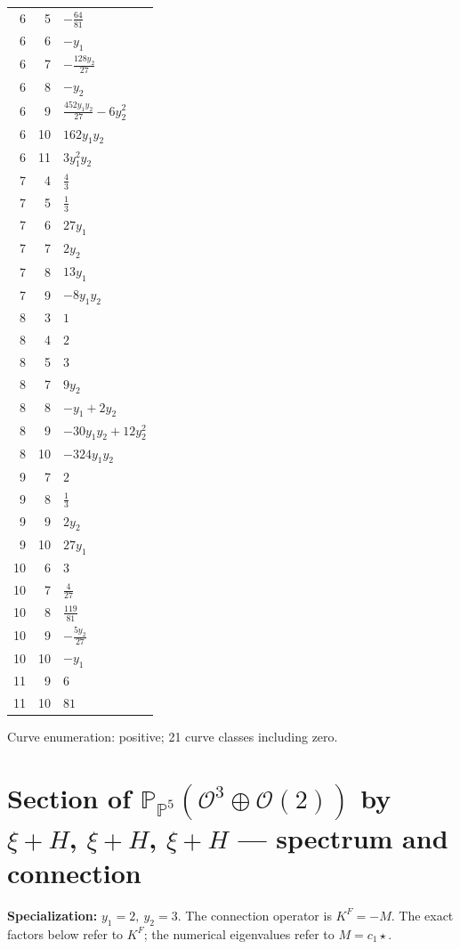 \documentclass[10pt,a4paper]{article}
\begin{document}
{\begin{longtable}{rrp{125mm}}
6 & 5 & $- \frac{64}{81}$\\
6 & 6 & $- y_{1}$\\
6 & 7 & $- \frac{128 y_{2}}{27}$\\
6 & 8 & $- y_{2}$\\
6 & 9 & $\frac{452 y_{1} y_{2}}{27} - 6 y_{2}^{2}$\\
6 & 10 & $162 y_{1} y_{2}$\\
6 & 11 & $3 y_{1}^{2} y_{2}$\\
7 & 4 & $\frac{4}{3}$\\
7 & 5 & $\frac{1}{3}$\\
7 & 6 & $27 y_{1}$\\
7 & 7 & $2 y_{2}$\\
7 & 8 & $13 y_{1}$\\
7 & 9 & $- 8 y_{1} y_{2}$\\
8 & 3 & $1$\\
8 & 4 & $2$\\
8 & 5 & $3$\\
8 & 7 & $9 y_{2}$\\
8 & 8 & $- y_{1} + 2 y_{2}$\\
8 & 9 & $- 30 y_{1} y_{2} + 12 y_{2}^{2}$\\
8 & 10 & $- 324 y_{1} y_{2}$\\
9 & 7 & $2$\\
9 & 8 & $\frac{1}{3}$\\
9 & 9 & $2 y_{2}$\\
9 & 10 & $27 y_{1}$\\
10 & 6 & $3$\\
10 & 7 & $\frac{4}{27}$\\
10 & 8 & $\frac{119}{81}$\\
10 & 9 & $- \frac{5 y_{2}}{27}$\\
10 & 10 & $- y_{1}$\\
11 & 9 & $6$\\
11 & 10 & $81$\\
\end{longtable}}
Curve enumeration: positive; 21 curve classes including zero.
\clearpage\section*{Section of $\mathbb P_{\mathbb P^{5}}(\mathcal O^{3}\oplus \mathcal O(2))$ by $\xi +H$, $\xi +H$, $\xi +H$ --- spectrum and connection}
\textbf{Specialization:} $y_1=2,\ y_2=3$. The connection operator is $K^F=-M$. The exact factors below refer to $K^F$; the numerical eigenvalues refer to $M=c_1\star$.
\end{document}
